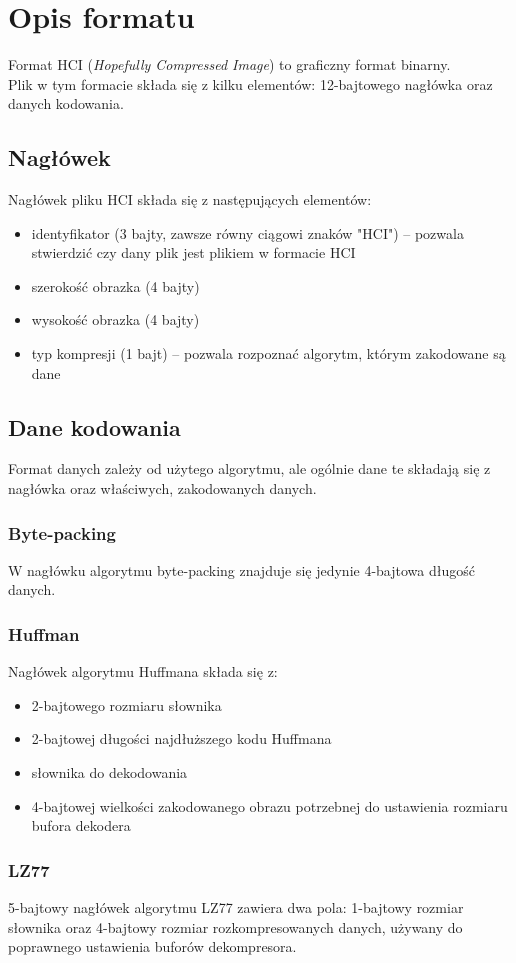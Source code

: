 \documentclass[12pt,a4paper]{article}
\begin{document}
	\section{Opis formatu}
		Format HCI (\emph{Hopefully Compressed Image}) to graficzny format binarny.\\
		Plik w tym formacie składa się z kilku elementów: 12-bajtowego nagłówka oraz danych kodowania.
		\subsection{Nagłówek}
			Nagłówek pliku HCI składa się z następujących elementów:
			\begin{itemize}
				\item identyfikator (3 bajty, zawsze równy ciągowi znaków "HCI") -- pozwala stwierdzić czy dany plik jest plikiem w formacie HCI
				\item szerokość obrazka (4 bajty)
				\item wysokość obrazka (4 bajty)
				\item typ kompresji (1 bajt) -- pozwala rozpoznać algorytm, którym zakodowane są dane
			\end{itemize}
		\subsection{Dane kodowania}
			Format danych zależy od użytego algorytmu, ale ogólnie dane te składają się z nagłówka oraz właściwych, zakodowanych danych.
			\subsubsection{Byte-packing}
				W nagłówku algorytmu byte-packing znajduje się jedynie 4-bajtowa długość danych.
			\subsubsection{Huffman}
				Nagłówek algorytmu Huffmana składa się z:
				\begin{itemize}
					\item 2-bajtowego rozmiaru słownika
					\item 2-bajtowej długości najdłuższego kodu Huffmana
					\item słownika do dekodowania
					\item 4-bajtowej wielkości zakodowanego obrazu potrzebnej do ustawienia rozmiaru bufora dekodera
				\end{itemize}
			\subsubsection{LZ77}
				5-bajtowy nagłówek algorytmu LZ77 zawiera dwa pola: 1-bajtowy rozmiar słownika oraz 4-bajtowy rozmiar rozkompresowanych danych, używany do
				poprawnego ustawienia buforów dekompresora.
\end{document}
